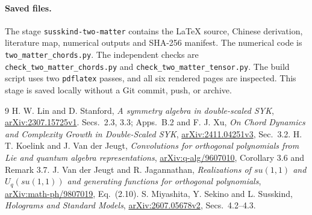 \documentclass[11pt,a4paper]{article}
\begin{document}
\paragraph{Saved files.}
The stage \texttt{susskind-two-matter} contains the LaTeX source,
Chinese derivation, literature map, numerical outputs and SHA-256
manifest. The numerical code is \nolinkurl{two_matter_chords.py}.
The independent checks are \nolinkurl{check_two_matter_chords.py}
and \nolinkurl{check_two_matter_tensor.py}.
The build script uses two \texttt{pdflatex} passes, and all six
rendered pages are inspected. This stage is saved locally without
a Git commit, push, or archive.

\begin{thebibliography}{9}
 H. W. Lin and D. Stanford,
\emph{A symmetry algebra in double-scaled SYK},
\href{https://arxiv.org/abs/2307.15725}{arXiv:2307.15725v1}.
Secs.~2.3, 3.3; Apps.~B.2 and F.
 J. Xu,
\emph{On Chord Dynamics and Complexity Growth in Double-Scaled SYK},
\href{https://arxiv.org/abs/2411.04251}{arXiv:2411.04251v3}, Sec.~3.2.
 H. T. Koelink and J. Van der Jeugt,
\emph{Convolutions for orthogonal polynomials from Lie and quantum
algebra representations},
\href{https://arxiv.org/abs/q-alg/9607010}{arXiv:q-alg/9607010},
Corollary 3.6 and Remark 3.7.
 J. Van der Jeugt and R. Jagannathan,
\emph{Realizations of $su(1,1)$ and $U_q(su(1,1))$ and generating
functions for orthogonal polynomials},
\href{https://arxiv.org/abs/math-ph/9807019}{arXiv:math-ph/9807019}, Eq.~(2.10).
 S. Miyashita, Y. Sekino and L. Susskind,
\emph{Holograms and Standard Models},
\href{https://arxiv.org/abs/2607.05678}{arXiv:2607.05678v2}, Secs.~4.2--4.3.
\end{thebibliography}
\end{document}
